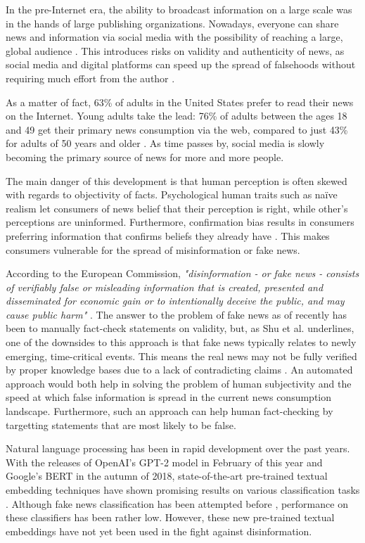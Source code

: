 In the pre-Internet era, the ability to broadcast information on a large scale was in the hands of large publishing organizations. 
Nowadays, everyone can share news and information via social media with the possibility of reaching a large, global audience \cite{howell2013}. 
This introduces risks on validity and authenticity of news, as social media and digital platforms can speed up the spread of falsehoods without requiring much effort from the author \cite{europeancommission2018}. 

As a matter of fact, 63\% of adults in the United States prefer to read their news on the Internet. 
Young adults take the lead: 76\% of adults between the ages 18 and 49 get their primary news consumption via the web, compared to just 43\% for adults of 50 years and older \cite{mitchell2018}.
As time passes by, social media is slowly becoming the primary source of news for more and more people. 

The main danger of this development is that human perception is often skewed with regards to objectivity of facts. 
Psychological human traits such as naïve realism let consumers of news belief that their perception is right, while other's perceptions are uninformed. 
Furthermore, confirmation bias results in consumers preferring information that confirms beliefs they already have \cite{shu2017}. 
This makes consumers vulnerable for the spread of misinformation or fake news. 

According to the European Commission, \textit{"disinformation - or fake news - consists of verifiably false or misleading information that is created, presented and disseminated for economic gain or to intentionally deceive the public, and may cause public harm"} \cite{europeancommission2018}. 
The answer to the problem of fake news as of recently has been to manually fact-check statements on validity, but, as Shu et al. underlines, one of the downsides to this approach is that fake news typically relates to newly emerging, time-critical events. 
This means the real news may not be fully verified by proper knowledge bases due to a lack of contradicting claims \cite{shu2017}. 
An automated approach would both help in solving the problem of human subjectivity and the speed at which false information is spread in the current news consumption landscape.
Furthermore, such an approach can help human fact-checking by targetting statements that are most likely to be false.

Natural language processing has been in rapid development over the past years. 
With the releases of OpenAI's GPT-2 model in February of this year and Google's BERT in the autumn of 2018, state-of-the-art pre-trained textual embedding techniques have shown promising results on various classification tasks \cite{radford2019,devlin2018}. 
Although fake news classification has been attempted before \cite{wang2018,khurana2017}, performance on these classifiers has been rather low. 
However, these new pre-trained textual embeddings have not yet been used in the fight against disinformation. 

